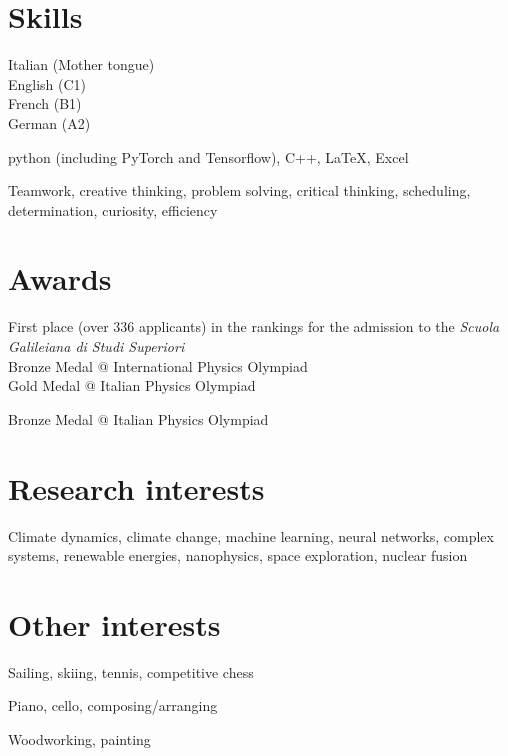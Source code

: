 \documentclass[11pt, a4 paper]{article}
\begin{document}
\section*{Skills}
  \begin{description}[style=multiline,leftmargin=3cm,align=right]
    \item[Languages]
      Italian (Mother tongue) \\
      English (C1) \\
      French (B1) \\
      German (A2)
    \item[Software]
      python (including PyTorch and Tensorflow), C++, LaTeX, Excel
    \item[Transversal]
      Teamwork, creative thinking, problem solving, critical thinking, scheduling, determination, curiosity, efficiency
  \end{description}


\section*{Awards}
  \begin{description}[style=multiline,leftmargin=3cm,align=right]
    \item[2016]
      First place (over 336 applicants) in the rankings for the admission to the \emph{Scuola Galileiana di Studi Superiori} \\
      Bronze Medal @ International Physics Olympiad \\
      Gold Medal @ Italian Physics Olympiad
    \item[2015] Bronze Medal @ Italian Physics Olympiad
  \end{description}


\section*{Research interests}
  \begin{description}[style=multiline,leftmargin=3cm,align=right]
    \item[] Climate dynamics, climate change, machine learning, neural networks, complex systems, renewable energies, nanophysics, space exploration, nuclear fusion
  \end{description}


\section*{Other interests}
  \begin{description}[style=multiline,leftmargin=3cm,align=right]
    \item[Sports] Sailing, skiing, tennis, competitive chess
    \item[Music] Piano, cello, composing/arranging
    \item[Other] Woodworking, painting
  \end{description}
\end{document}
